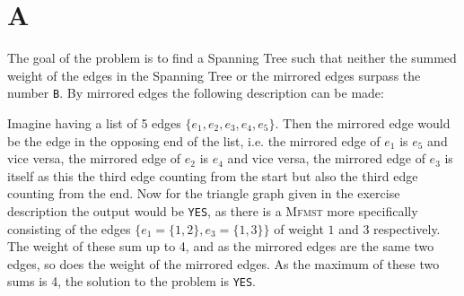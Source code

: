 \section{A}
The goal of the problem is to find a Spanning Tree such that neither the summed weight of the edges in the Spanning Tree or the mirrored edges surpass the number \verb=B=. By mirrored edges the following description can be made: 

Imagine having a list of 5 edges $\{e_1,e_2,e_3,e_4,e_5\}$. Then the mirrored edge would be the edge in the opposing end of the list, i.e. the mirrored edge of $e_1$ is $e_5$ and vice versa, the mirrored edge of $e_2$ is $e_4$ and vice versa, the mirrored edge of $e_3$ is itself as this the third edge counting from the start but also the third edge counting from the end.
\newline \newline
Now for the triangle graph given in the exercise description the output would be \verb=YES=, as there is a \textsc{Mfmst} more specifically consisting of the edges $\{e_1 = \{1,2\}, e_3 = \{1,3\}\}$ of weight $1$ and $3$ respectively. The weight of these sum up to 4, and as the mirrored edges are the same two edges, so does the weight of the mirrored edges. As the maximum of these two sums is 4, the solution to the problem is \verb=YES=.